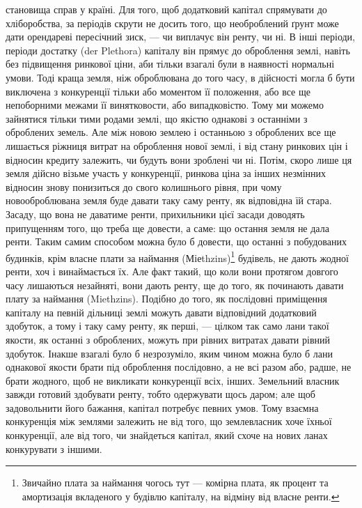 \parcont{}  %
становища справ у країні. Для того, щоб додатковий капітал спрямувати до
хліборобства, за періодів скрути не досить того, що необроблений ґрунт може
дати орендареві пересічний зиск, — чи виплачує він ренту, чи ні. В інші періоди,
періоди достатку (der Plethora) капіталу він прямує до оброблення землі, навіть
без підвищення ринкової ціни, аби тільки взагалі були в наявності нормальні
умови. Тоді краща земля, ніж оброблювана до того часу, в дійсності могла б
бути виключена з конкуренції тільки або моментом її положення, або все ще
непоборними межами її винятковости, або випадковістю. Тому ми можемо зайнятися
тільки тими родами землі, що якістю однакові з останніми з оброблених
земель. Але між новою землею і останньою з оброблених все ще лишається
ріжниця витрат на оброблення нової землі, і від стану ринкових цін і відносин
кредиту залежить, чи будуть вони зроблені чи ні. Потім, скоро лише ця земля
дійсно візьме участь у конкуренції, ринкова ціна за інших незмінних відносин
знову понизиться до свого колишнього рівня, при чому новооброблювана земля
буде давати таку саму ренту, як відповідна їй стара. Засаду, що вона не даватиме
ренти, прихильники цієї засади доводять припущенням того, що треба ще довести,
а саме: що остання земля не дала ренти. Таким самим способом можна було б довести,
що останні з побудованих будинків, крім власне плати за наймання (Міеthzins)\footnote*{
Звичайно плата за наймання чогось тут — комірна плата, як процент та амортизація
вкладеного у будівлю капіталу, на відміну від власне ренти. 
}
будівель, не дають жодної ренти, хоч і винаймається їх. Але факт такий,
що коли вони протягом довгого часу лишаються незайняті, вони дають ренту, ще
до того, як починають давати плату за наймання (Miethzins). Подібно до того,
як послідовні приміщення капіталу на певній дільниці землі можуть давати
відповідний додатковий здобуток, а тому і таку саму ренту, як перші, — цілком
так само лани такої якости, як останні з оброблених, можуть при рівних витратах
давати рівний здобуток. Інакше взагалі було б незрозуміло, яким чином
можна було б лани однакової якости брати під оброблення послідовно, а не
всі разом або, радше, не брати жодного, щоб не викликати конкуренції всіх,
інших. Земельний власник завжди готовий здобувати ренту, тобто одержувати
щось даром; але щоб задовольнити його бажання, капітал потребує певних
умов. Тому взаємна конкуренція між землями залежить не від того, що землевласник
хоче їхньої конкуренції, але від того, чи знайдеться капітал, який
схоче на нових ланах конкурувати з іншими.

